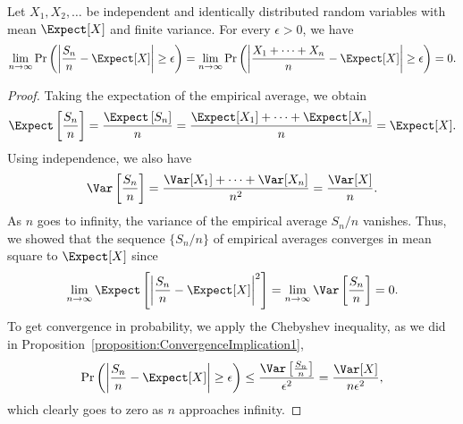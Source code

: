 \begin{theorem} 
Let $X_1, X_2, \ldots$ be independent and identically distributed random variables with mean $\Expect [X]$ and finite variance.
For every $\epsilon > 0$, we have
\begin{equation*}
\lim_{n \rightarrow \infty}
\Pr \left( \left| \frac{S_n}{n} - \Expect [X] \right| \geq \epsilon \right)
= \lim_{n \rightarrow \infty}
\Pr \left( \left| \frac{X_1 + \cdots + X_n}{n} - \Expect [X] \right| \geq \epsilon \right)
= 0 .
\end{equation*}
\end{theorem}
\begin{proof}
Taking the expectation of the empirical average, we obtain
\begin{equation*}
\Expect \left[ \frac{S_n}{n} \right]
= \frac{ \Expect \left[ S_n \right] }{n}
= \frac{\Expect [X_1] + \cdots + \Expect [X_n] }{n}
= \Expect [X] .
\end{equation*}
Using independence, we also have
\begin{equation*}
\Var \left[ \frac{S_n}{n} \right]
= \frac{ \Var [X_1] + \cdots + \Var [X_n] }{n^2}
= \frac{ \Var [X] }{n} .
\end{equation*}
As $n$ goes to infinity, the variance of the empirical average $S_n / n$ vanishes.
Thus, we showed that the sequence $\{ S_n / n \}$ of empirical averages converges in mean square to $\Expect [X]$ since
\begin{equation*}
\lim_{n \rightarrow \infty}
\Expect \left[ \left| \frac{S_n}{n} - \Expect [X] \right|^2 \right] 
= \lim_{n \rightarrow \infty}
\Var \left[ \frac{S_n}{n} \right] = 0 .
\end{equation*}
To get convergence in probability, we apply the Chebyshev inequality, as we did in Proposition~\ref{proposition:ConvergenceImplication1},
\begin{equation*}
\Pr \left( \left| \frac{S_n}{n} - \Expect [X] \right| \geq \epsilon \right)
\leq \frac{ \Var \left[ \frac{S_n}{n} \right] }{\epsilon^2}
= \frac{ \Var [X] }{n \epsilon^2} ,
\end{equation*}
which clearly goes to zero as $n$ approaches infinity.
\end{proof}

